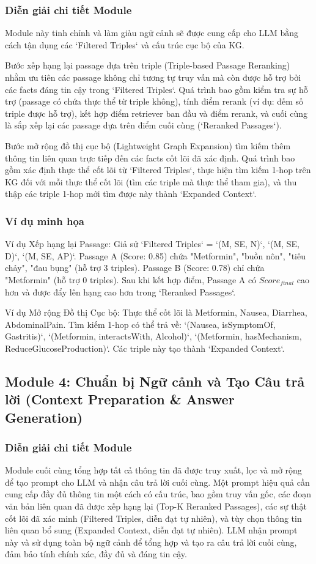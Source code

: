 \documentclass{article}
\begin{document}
\subsubsection{Diễn giải chi tiết Module}
Module này tinh chỉnh và làm giàu ngữ cảnh sẽ được cung cấp cho LLM bằng cách tận dụng các `Filtered Triples` và cấu trúc cục bộ của KG.

Bước xếp hạng lại passage dựa trên triple (Triple-based Passage Reranking) nhằm ưu tiên các passage không chỉ tương tự truy vấn mà còn được hỗ trợ bởi các facts đáng tin cậy trong `Filtered Triples`. Quá trình bao gồm kiểm tra sự hỗ trợ (passage có chứa thực thể từ triple không), tính điểm rerank (ví dụ: đếm số triple được hỗ trợ), kết hợp điểm retriever ban đầu và điểm rerank, và cuối cùng là sắp xếp lại các passage dựa trên điểm cuối cùng (`Reranked Passages`).

Bước mở rộng đồ thị cục bộ (Lightweight Graph Expansion) tìm kiếm thêm thông tin liên quan trực tiếp đến các facts cốt lõi đã xác định. Quá trình bao gồm xác định thực thể cốt lõi từ `Filtered Triples`, thực hiện tìm kiếm 1-hop trên KG đối với mỗi thực thể cốt lõi (tìm các triple mà thực thể tham gia), và thu thập các triple 1-hop mới tìm được này thành `Expanded Context`.

\subsubsection{Ví dụ minh họa}
Ví dụ Xếp hạng lại Passage: Giả sử `Filtered Triples` = {`(M, SE, N)`, `(M, SE, D)`, `(M, SE, AP)`}. Passage A (Score: 0.85) chứa "Metformin", "buồn nôn", "tiêu chảy", "đau bụng" (hỗ trợ 3 triples). Passage B (Score: 0.78) chỉ chứa "Metformin" (hỗ trợ 0 triples). Sau khi kết hợp điểm, Passage A có $Score_{final}$ cao hơn và được đẩy lên hạng cao hơn trong `Reranked Passages`.

Ví dụ Mở rộng Đồ thị Cục bộ: Thực thể cốt lõi là {Metformin, Nausea, Diarrhea, AbdominalPain}. Tìm kiếm 1-hop có thể trả về: `(Nausea, isSymptomOf, Gastritis)`, `(Metformin, interactsWith, Alcohol)`, `(Metformin, hasMechanism, ReduceGlucoseProduction)`. Các triple này tạo thành `Expanded Context`.

\subsection{Module 4: Chuẩn bị Ngữ cảnh và Tạo Câu trả lời (Context Preparation \& Answer Generation)}

\subsubsection{Diễn giải chi tiết Module}
Module cuối cùng tổng hợp tất cả thông tin đã được truy xuất, lọc và mở rộng để tạo prompt cho LLM và nhận câu trả lời cuối cùng. Một prompt hiệu quả cần cung cấp đầy đủ thông tin một cách có cấu trúc, bao gồm truy vấn gốc, các đoạn văn bản liên quan đã được xếp hạng lại (Top-K Reranked Passages), các sự thật cốt lõi đã xác minh (Filtered Triples, diễn đạt tự nhiên), và tùy chọn thông tin liên quan bổ sung (Expanded Context, diễn đạt tự nhiên). LLM nhận prompt này và sử dụng toàn bộ ngữ cảnh để tổng hợp và tạo ra câu trả lời cuối cùng, đảm bảo tính chính xác, đầy đủ và đáng tin cậy.
\end{document}
